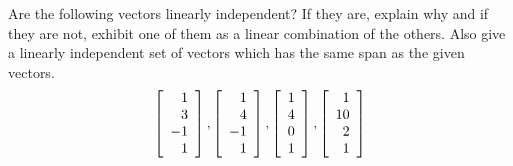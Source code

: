 \begin{enumialphparenastyle}

\begin{ex} Are the following vectors linearly independent? If they are, explain
why and if they are not, exhibit one of them as a linear combination of the
others. Also give a linearly independent set of vectors which has the same
span as the given vectors. 
\begin{equation*}
\left[ 
\begin{array}{r}
1 \\ 
3 \\ 
-1 \\ 
1
\end{array}
\right] ,\left[ 
\begin{array}{r}
1 \\ 
4 \\ 
-1 \\ 
1
\end{array}
\right] ,\left[ 
\begin{array}{r}
1 \\ 
4 \\ 
0 \\ 
1
\end{array}
\right] ,\left[ 
\begin{array}{r}
1 \\ 
10 \\ 
2 \\ 
1
\end{array}
\right]
\end{equation*}
\end{ex}


\end{enumialphparenastyle}
